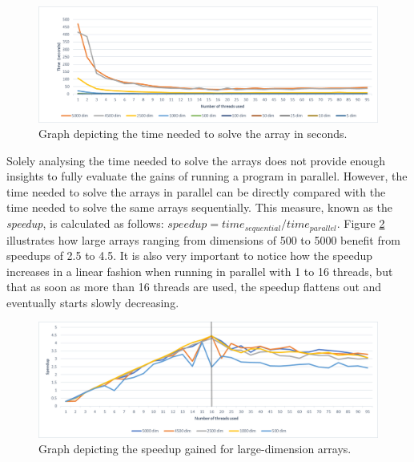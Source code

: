 \documentclass[letterpaper,12pt]{article}
\begin{document}
\begin{figure}[h]
\centerline{\includegraphics[width=\textwidth]{report/plots/time.png}}
\caption{\label{fig:time}Graph depicting the time needed to solve the array in seconds.}
\end{figure}

Solely analysing the time needed to solve the arrays does not provide enough insights to fully evaluate the gains of running a program in parallel. However, the time needed to solve the arrays in parallel can be directly compared with the time needed to solve the same arrays sequentially. This measure, known as the \textit{speedup}, is calculated as follows: $speedup = time_{sequential} / time_{parallel}$. Figure \ref{fig:speedup_big} illustrates how large arrays ranging from dimensions of 500 to 5000 benefit from speedups of 2.5 to 4.5. It is also very important to notice how the speedup increases in a linear fashion when running in parallel with 1 to 16 threads, but that as soon as more than 16 threads are used, the speedup flattens out and eventually starts slowly decreasing.\\

\begin{figure}[h]
\centerline{\includegraphics[width=\textwidth]{report/plots/speedup_big.png}}
\caption{\label{fig:speedup_big}Graph depicting the speedup gained for large-dimension arrays.}
\end{figure}
\end{document}
